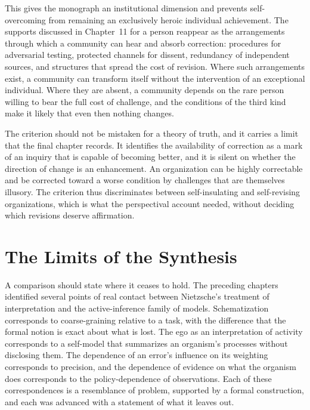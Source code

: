 This gives the monograph an institutional dimension and prevents self-overcoming from remaining an exclusively heroic individual achievement. The supports discussed in Chapter~11 for a person reappear as the arrangements through which a community can hear and absorb correction: procedures for adversarial testing, protected channels for dissent, redundancy of independent sources, and structures that spread the cost of revision. Where such arrangements exist, a community can transform itself without the intervention of an exceptional individual. Where they are absent, a community depends on the rare person willing to bear the full cost of challenge, and the conditions of the third kind make it likely that even then nothing changes.

The criterion should not be mistaken for a theory of truth, and it carries a limit that the final chapter records. It identifies the availability of correction as a mark of an inquiry that is capable of becoming better, and it is silent on whether the direction of change is an enhancement. An organization can be highly correctable and be corrected toward a worse condition by challenges that are themselves illusory. The criterion thus discriminates between self-insulating and self-revising organizations, which is what the perspectival account needed, without deciding which revisions deserve affirmation.

\chapter{The Limits of the Synthesis}

A comparison should state where it ceases to hold. The preceding chapters identified several points of real contact between Nietzsche's treatment of interpretation and the active-inference family of models. Schematization corresponds to coarse-graining relative to a task, with the difference that the formal notion is exact about what is lost. The ego as an interpretation of activity corresponds to a self-model that summarizes an organism's processes without disclosing them. The dependence of an error's influence on its weighting corresponds to precision, and the dependence of evidence on what the organism does corresponds to the policy-dependence of observations. Each of these correspondences is a resemblance of problem, supported by a formal construction, and each was advanced with a statement of what it leaves out.

